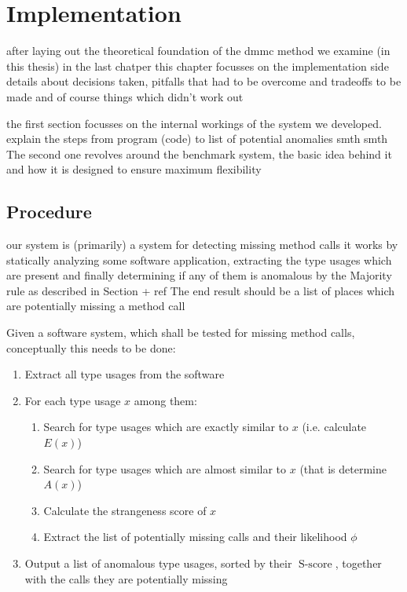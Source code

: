 \chapter{Implementation}


after laying out the theoretical foundation of the dmmc method we examine (in this thesis) in the last chatper
this chapter focusses on the implementation side
details about decisions taken, pitfalls that had to be overcome and tradeoffs to be made
and of course things which didn't work out

the first section focusses on the internal workings of the system we developed.
explain the steps from program (code) to list of potential anomalies
smth smth
The second one revolves around the benchmark system, the basic idea behind it and how it is designed to ensure maximum flexibility

\section{Procedure}

our system is (primarily) a system for detecting missing method calls
it works by statically analyzing some software application, extracting the type usages which are present
and finally determining if any of them is anomalous by the Majority rule as described in Section + ref
The end result should be a list of places which are potentially missing a method call

Given a software system, which shall be tested for missing method calls, 
conceptually this needs to be done:

\begin{enumerate}
    \item Extract all type usages from the software
    \item For each type usage $x$ among them:
    \begin{enumerate}
        \item Search for type usages which are exactly similar to $x$ (i.e. calculate $E(x)$)
        \item Search for type usages which are almost similar to $x$ (that is determine $A(x)$)
        \item Calculate the strangeness score of $x$
        \item Extract the list of potentially missing calls and their likelihood $\phi$
    \end{enumerate}
    \item Output a list of anomalous type usages, sorted by their $\operatorname{S-score}$, together with the calls they are potentially missing
\end{enumerate}

